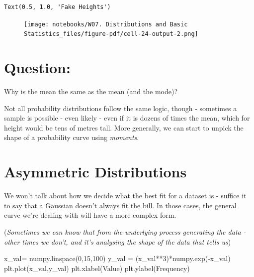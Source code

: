 \documentclass[
  letterpaper,
  DIV=11,
  numbers=noendperiod]{scrreprt}
\newenvironment{Shaded}{\begin{snugshade}}{\end{snugshade}}
\newcommand{\DecValTok}[1]{\textcolor[rgb]{0.68,0.00,0.00}{#1}}
\newcommand{\NormalTok}[1]{\textcolor[rgb]{0.00,0.23,0.31}{#1}}
\newcommand{\OperatorTok}[1]{\textcolor[rgb]{0.37,0.37,0.37}{#1}}
\newcommand{\StringTok}[1]{\textcolor[rgb]{0.13,0.47,0.30}{#1}}
\begin{document}
\begin{verbatim}
Text(0.5, 1.0, 'Fake Heights')
\end{verbatim}

\begin{figure}[H]

{\centering \texttt{[image: notebooks/W07. Distributions and Basic Statistics\_files/figure-pdf/cell-24-output-2.png]}

}

\end{figure}


\hypertarget{question}{%
\chapter{Question:}\label{question}}

Why is the mean the same as the mean (and the mode)?

Not all probability distributions follow the same logic, though -
sometimes a sample is possible - even likely - even if it is dozens of
times the mean, which for height would be tens of metres tall. More
generally, we can start to unpick the shape of a probability curve using
\emph{moments}.


\hypertarget{asymmetric-distributions}{%
\chapter{Asymmetric Distributions}\label{asymmetric-distributions}}

We won't talk about how we decide what the best fit for a dataset is -
suffice it to say that a Gaussian doesn't always fit the bill. In those
cases, the general curve we're dealing with will have a more complex
form.

(\emph{Sometimes we can know that from the underlying process generating
the data - other times we don't, and it's analysing the shape of the
data that tells us})

\begin{Shaded}
\begin{Highlighting}[]
\NormalTok{x\_val}\OperatorTok{=}\NormalTok{ numpy.linspace(}\DecValTok{0}\NormalTok{,}\DecValTok{15}\NormalTok{,}\DecValTok{100}\NormalTok{)}
\NormalTok{y\_val }\OperatorTok{=}\NormalTok{ (x\_val}\OperatorTok{**}\DecValTok{3}\NormalTok{)}\OperatorTok{*}\NormalTok{numpy.exp(}\OperatorTok{{-}}\NormalTok{x\_val)}
\NormalTok{plt.plot(x\_val,y\_val)}
\NormalTok{plt.xlabel(}\StringTok{\textquotesingle{}Value\textquotesingle{}}\NormalTok{)}
\NormalTok{plt.ylabel(}\StringTok{\textquotesingle{}Frequency\textquotesingle{}}\NormalTok{)}
\end{Highlighting}
\end{Shaded}
\end{document}
